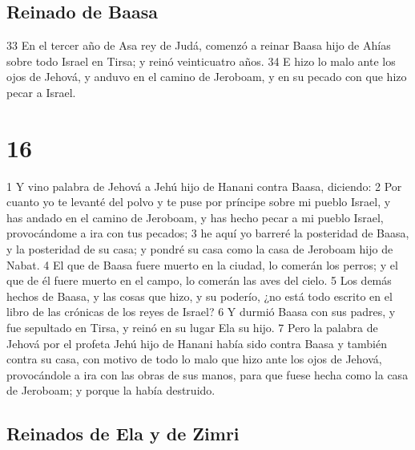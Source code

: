 \section*{Reinado de Baasa}

33 En el tercer año de Asa rey de Judá, comenzó a reinar Baasa hijo de Ahías sobre todo Israel en Tirsa; y reinó veinticuatro años.
34 E hizo lo malo ante los ojos de Jehová, y anduvo en el camino de Jeroboam, y en su pecado con que hizo pecar a Israel.

\chapter{16}

1 Y vino palabra de Jehová a Jehú hijo de Hanani contra Baasa, diciendo:
2 Por cuanto yo te levanté del polvo y te puse por príncipe sobre mi pueblo Israel, y has andado en el camino de Jeroboam, y has hecho pecar a mi pueblo Israel, provocándome a ira con tus pecados;
3 he aquí yo barreré la posteridad de Baasa, y la posteridad de su casa; y pondré su casa como la casa de Jeroboam hijo de Nabat.
4 El que de Baasa fuere muerto en la ciudad, lo comerán los perros; y el que de él fuere muerto en el campo, lo comerán las aves del cielo.
5 Los demás hechos de Baasa, y las cosas que hizo, y su poderío, ¿no está todo escrito en el libro de las crónicas de los reyes de Israel?
6 Y durmió Baasa con sus padres, y fue sepultado en Tirsa, y reinó en su lugar Ela su hijo.
7 Pero la palabra de Jehová por el profeta Jehú hijo de Hanani había sido contra Baasa y también contra su casa, con motivo de todo lo malo que hizo ante los ojos de Jehová, provocándole a ira con las obras de sus manos, para que fuese hecha como la casa de Jeroboam; y porque la había destruido.

\section*{Reinados de Ela y de Zimri}

